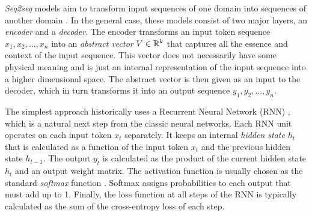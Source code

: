 
\emph{Seq2seq} models aim to transform input sequences of one domain into
sequences of another domain \citep{Sutskever_2014}. In the general case, these
models consist of two major layers, an \emph{encoder} and a \emph{decoder}. The
encoder transforms an input token sequence $x_1, x_2, \dots, x_n$ into an
\emph{abstract vector} $V \in \mathbb{R}^k$ that captures all the essence and context of
the input sequence. This vector does not necessarily have some physical meaning
and is just an internal representation of the input sequence into a higher
dimensional space. The abstract vector is then given as an input to the decoder,
which in turn transforms it into an output sequence $y_1, y_2, \dots, y_n$.


The simplest approach historically uses a Recurrent Neural Network (RNN)
\citep{Rumelhart1986, Werbos1990}, which is a natural next step from the classic
neural networks. Each RNN unit operates on each input token $x_t$ separately. It
keeps an internal \emph{hidden state} $h_t$ that is calculated as
a function of the input token $x_t$ and the previous hidden state $h_{t-1}$.
The output $y_t$ is calculated as
the product of the current hidden state $h_t$ and an output weight matrix. The
activation function is usually chosen as the standard \emph{softmax} function
\citep{Goodfellow-et-al-2016, Bishop-book-2006}. Softmax assigns probabilities
to each output that must add up to 1.
Finally, the loss function at all steps of the RNN is typically calculated as
the sum of the cross-entropy loss of each step.

